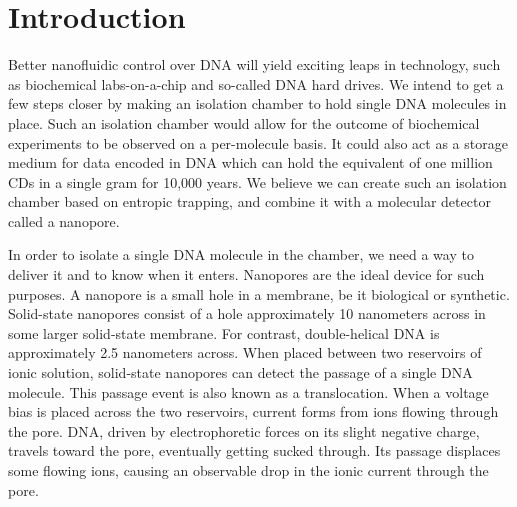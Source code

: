 \documentclass[aps,prl,preprint,groupedaddress]{revtex4}
\begin{document}
\pacs{}

\maketitle

\tableofcontents
\newpage

\section{Introduction}

Better nanofluidic control over DNA will yield exciting leaps in technology, such as biochemical labs-on-a-chip and so-called DNA hard drives.
We intend to get a few steps closer by making an isolation chamber to hold single DNA molecules in place.
Such an isolation chamber would allow for the outcome of biochemical experiments to be observed on a per-molecule basis.
It could also act as a storage medium for data encoded in DNA which can hold the equivalent of one million CDs in a single gram for 10,000 years\cite{dna-hard-drive}.
We believe we can create such an isolation chamber based on entropic trapping, and combine it with a molecular detector called a nanopore.

In order to isolate a single DNA molecule in the chamber, we need a way to deliver it and to know when it enters.
Nanopores are the ideal device for such purposes.
A nanopore is a small hole in a membrane, be it biological or synthetic.
Solid-state nanopores consist of a hole approximately 10 nanometers across in some larger solid-state membrane.
For contrast, double-helical DNA is approximately 2.5 nanometers across.
When placed between two reservoirs of ionic solution, solid-state nanopores can detect the passage of a single DNA molecule.
This passage event is also known as a translocation.
When a voltage bias is placed across the two reservoirs, current forms from ions flowing through the pore.
DNA, driven by electrophoretic forces on its slight negative charge, travels toward the pore, eventually getting sucked through.
Its passage displaces some flowing ions, causing an observable drop in the ionic current through the pore.
\end{document}
